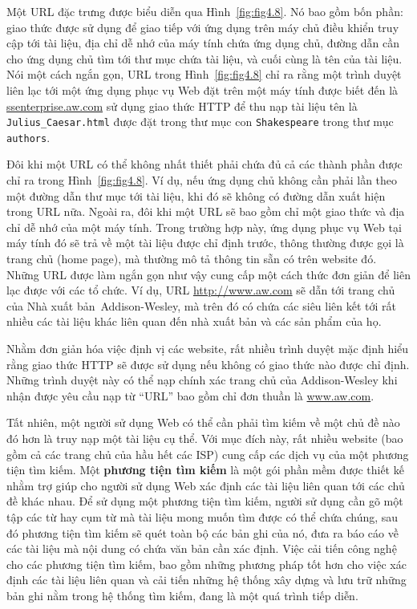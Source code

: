 Một URL đặc trưng được biểu diễn qua Hình~\ref{fig:fig4.8}. Nó bao gồm bốn phần: giao thức
được sử dụng để giao tiếp với ứng dụng trên máy chủ điều khiển truy cập tới tài liệu, địa
chỉ dễ nhớ của máy tính chứa ứng dụng chủ, đường dẫn cần cho ứng dụng chủ tìm tới thư mục
chứa tài liệu, và cuối cùng là tên của tài liệu. Nói một cách ngắn gọn, URL trong
Hình~\ref{fig:fig4.8} chỉ ra rằng một trình duyệt liên lạc tới một ứng dụng phục vụ Web
đặt trên một máy tính được biết đến là \url{ssenterprise.aw.com} sử dụng giao thức HTTP để
thu nạp tài liệu tên là \texttt{Julius\_Caesar.html} được đặt trong thư mục con
\texttt{Shakespeare} trong thư mục \texttt{authors}.

Đôi khi một URL có thể không nhất thiết phải chứa đủ cả các thành phần được chỉ ra trong
Hình~\ref{fig:fig4.8}. Ví dụ, nếu ứng dụng chủ không cần phải lần theo một đường dẫn thư
mục tới tài liệu, khi đó sẽ không có đường dẫn xuất hiện trong URL nữa. Ngoài ra, đôi khi
một URL sẽ bao gồm chỉ một giao thức và địa chỉ dễ nhớ của một máy tính. Trong trường hợp
này, ứng dụng phục vụ Web tại máy tính đó sẽ trả về một tài liệu được chỉ định trước,
thông thường được gọi là trang chủ (home page), mà thường mô tả thông tin sẵn có trên
website đó. Những URL được làm ngắn gọn như vậy cung cấp một cách thức đơn giản để liên
lạc được với các tổ chức. Ví dụ, URL \url{http://www.aw.com} sẽ dẫn tới trang chủ của Nhà
xuất bản~Addison-Wesley, mà trên đó có chứa các siêu liên kết tới rất nhiều các tài liệu
khác liên quan đến nhà xuất bản và các sản phẩm của họ.

Nhằm đơn giản hóa việc định vị các website, rất nhiều trình duyệt mặc định hiểu rằng giao
thức HTTP sẽ được sử dụng nếu không có giao thức nào được chỉ định. Những trình duyệt này
có thể nạp chính xác trang chủ của Addison-Wesley khi nhận được yêu cầu nạp từ ``URL'' bao
gồm chỉ đơn thuần là \url{www.aw.com}.

Tất nhiên, một người sử dụng Web có thể cần phải tìm kiếm về một chủ đề nào đó hơn là truy
nạp một tài liệu cụ thể. Với mục đích này, rất nhiều website (bao gồm cả các trang chủ của
hầu hết các ISP) cung cấp các dịch vụ của một phương tiện tìm kiếm. Một \textbf{phương
  tiện tìm kiếm} là một gói phần mềm được thiết kế nhằm trợ giúp cho người sử dụng Web xác
định các tài liệu liên quan tới các chủ đề khác nhau. Để sử dụng một phương tiện tìm kiếm,
người sử dụng cần gõ một tập các từ hay cụm từ mà tài liệu mong muốn tìm được có thể chứa
chúng, sau đó phương tiện tìm kiếm sẽ quét toàn bộ các bản ghi của nó, đưa ra báo cáo về
các tài liệu mà nội dung có chứa văn bản cần xác định. Việc cải tiến công nghệ cho các
phương tiện tìm kiếm, bao gồm những phương pháp tốt hơn cho việc xác định các tài liệu
liên quan và cải tiến những hệ thống xây dựng và lưu trữ những bản ghi nằm trong hệ thống
tìm kiếm, đang là một quá trình tiếp diễn.


